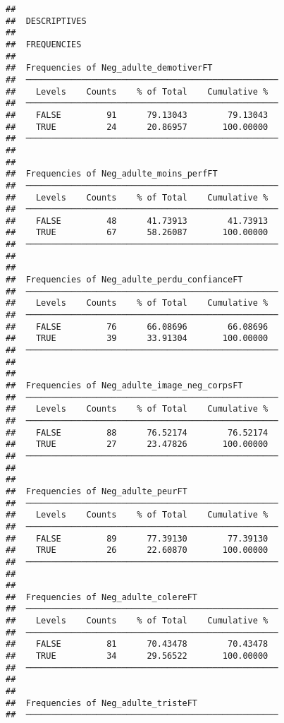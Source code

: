 \documentclass[
]{article}
\begin{document}
\begin{verbatim}
## 
##  DESCRIPTIVES
## 
##  FREQUENCIES
## 
##  Frequencies of Neg_adulte_demotiverFT              
##  ────────────────────────────────────────────────── 
##    Levels    Counts    % of Total    Cumulative %   
##  ────────────────────────────────────────────────── 
##    FALSE         91      79.13043        79.13043   
##    TRUE          24      20.86957       100.00000   
##  ────────────────────────────────────────────────── 
## 
## 
##  Frequencies of Neg_adulte_moins_perfFT             
##  ────────────────────────────────────────────────── 
##    Levels    Counts    % of Total    Cumulative %   
##  ────────────────────────────────────────────────── 
##    FALSE         48      41.73913        41.73913   
##    TRUE          67      58.26087       100.00000   
##  ────────────────────────────────────────────────── 
## 
## 
##  Frequencies of Neg_adulte_perdu_confianceFT        
##  ────────────────────────────────────────────────── 
##    Levels    Counts    % of Total    Cumulative %   
##  ────────────────────────────────────────────────── 
##    FALSE         76      66.08696        66.08696   
##    TRUE          39      33.91304       100.00000   
##  ────────────────────────────────────────────────── 
## 
## 
##  Frequencies of Neg_adulte_image_neg_corpsFT        
##  ────────────────────────────────────────────────── 
##    Levels    Counts    % of Total    Cumulative %   
##  ────────────────────────────────────────────────── 
##    FALSE         88      76.52174        76.52174   
##    TRUE          27      23.47826       100.00000   
##  ────────────────────────────────────────────────── 
## 
## 
##  Frequencies of Neg_adulte_peurFT                   
##  ────────────────────────────────────────────────── 
##    Levels    Counts    % of Total    Cumulative %   
##  ────────────────────────────────────────────────── 
##    FALSE         89      77.39130        77.39130   
##    TRUE          26      22.60870       100.00000   
##  ────────────────────────────────────────────────── 
## 
## 
##  Frequencies of Neg_adulte_colereFT                 
##  ────────────────────────────────────────────────── 
##    Levels    Counts    % of Total    Cumulative %   
##  ────────────────────────────────────────────────── 
##    FALSE         81      70.43478        70.43478   
##    TRUE          34      29.56522       100.00000   
##  ────────────────────────────────────────────────── 
## 
## 
##  Frequencies of Neg_adulte_tristeFT                 
##  ────────────────────────────────────────────────── 

\end{verbatim}
\end{document}
